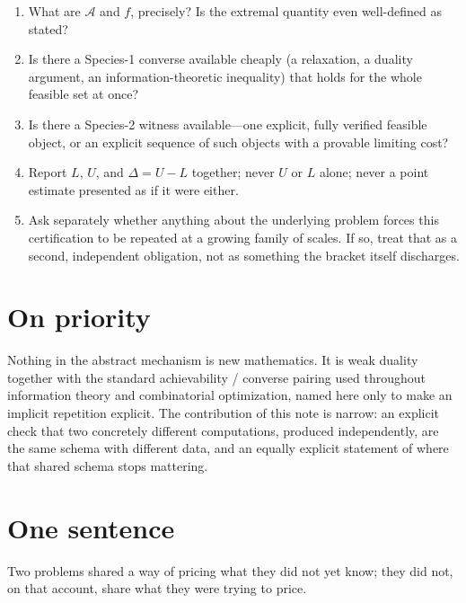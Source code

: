 \documentclass[11pt,a4paper]{article}
\newcommand{\Acal}{\mathcal{A}}
\begin{document}
\begin{enumerate}
  \item What are \(\Acal\) and \(f\), precisely? Is the extremal quantity even well-defined as stated?
  \item Is there a Species-1 converse available cheaply (a relaxation, a duality argument, an information-theoretic inequality) that holds for the whole feasible set at once?
  \item Is there a Species-2 witness available---one explicit, fully verified feasible object, or an explicit sequence of such objects with a provable limiting cost?
  \item Report \(L\), \(U\), and \(\Delta=U-L\) together; never \(U\) or \(L\) alone; never a point estimate presented as if it were either.
  \item Ask separately whether anything about the underlying problem forces this certification to be repeated at a growing family of scales. If so, treat that as a second, independent obligation, not as something the bracket itself discharges.
\end{enumerate}

\section{On priority}

Nothing in the abstract mechanism is new mathematics. It is weak duality together with the standard achievability / converse pairing used throughout information theory and combinatorial optimization, named here only to make an implicit repetition explicit. The contribution of this note is narrow: an explicit check that two concretely different computations, produced independently, are the same schema with different data, and an equally explicit statement of where that shared schema stops mattering.

\section*{One sentence}

Two problems shared a way of pricing what they did not yet know; they did not, on that account, share what they were trying to price.
\end{document}
